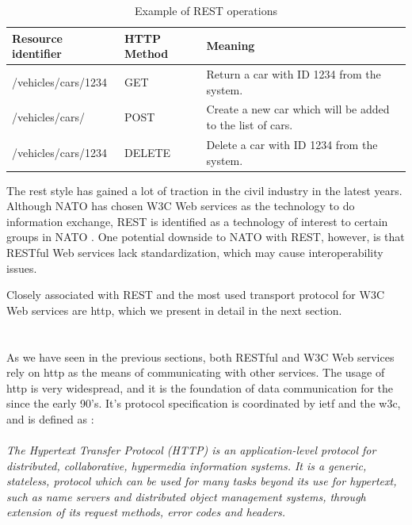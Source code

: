  \begin{table}[h]
 \begin{tabularx}{\textwidth}{| X | X | X |}
 \hline
   \textbf{Resource identifier} & \textbf{HTTP Method}  & \textbf{Meaning}\\ \hline
   /vehicles/cars/1234 & GET & Return a car with ID 1234 from the system. \\ \hline
   /vehicles/cars/ & POST & Create a new car which will be added to the list of cars. \\ \hline
   /vehicles/cars/1234 & DELETE & Delete a car with ID 1234 from the system. \\ \hline
 \end{tabularx}
 \caption{Example of REST operations}
 \label{table-rest}
 \end{table}

The \gls{rest} style has gained a lot of traction in the civil industry in the
latest years. Although NATO has chosen W3C Web services as the technology to do
information exchange, REST is identified as a technology of interest to certain
groups in NATO \cite{johnsen-recommendations}. One potential downside to NATO
with REST, however, is that RESTful Web services lack standardization, which may
cause interoperability issues.

Closely associated with REST and the most used transport protocol for W3C Web
services are \gls{http}, which we present in detail in the next section.


\section{}

As we have seen in the previous sections, both RESTful and W3C Web services rely
on \gls{http} as the means of communicating with other services. The usage of
\gls{http} is very widespread, and it is the foundation of data communication
for the  since the early 90's. It's protocol specification is
coordinated by \gls{ietf} and the \gls{w3c}, and is defined as \cite{rfc-2616}:

\paragraph{}
\textit{
    The Hypertext Transfer Protocol (HTTP) is an application-level
    protocol for distributed, collaborative, hypermedia information
    systems. It is a generic, stateless, protocol which can be used for
    many tasks beyond its use for hypertext, such as name servers and
    distributed object management systems, through extension of its
    request methods, error codes and headers.
}

